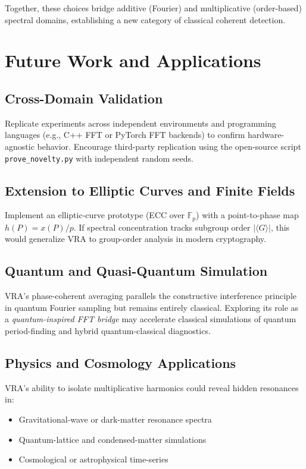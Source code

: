 \documentclass[conference]{IEEEtran}
\begin{document}
Together, these choices bridge additive (Fourier) and multiplicative (order-based) spectral domains, establishing a new category of classical coherent detection.


\section{Future Work and Applications}

\subsection{Cross-Domain Validation}

Replicate experiments across independent environments and programming languages (e.g., C++ FFT or PyTorch FFT backends) to confirm hardware-agnostic behavior.
Encourage third-party replication using the open-source script \texttt{prove\_novelty.py} with independent random seeds.

\subsection{Extension to Elliptic Curves and Finite Fields}

Implement an elliptic-curve prototype (ECC over $\mathbb{F}_p$) with a point-to-phase map $h(P) = x(P)/p$.
If spectral concentration tracks subgroup order $|\langle G \rangle|$, this would generalize VRA to group-order analysis in modern cryptography.

\subsection{Quantum and Quasi-Quantum Simulation}

VRA's phase-coherent averaging parallels the constructive interference principle in quantum Fourier sampling but remains entirely classical.
Exploring its role as a \emph{quantum-inspired FFT bridge} may accelerate classical simulations of quantum period-finding and hybrid quantum-classical diagnostics.

\subsection{Physics and Cosmology Applications}

VRA's ability to isolate multiplicative harmonics could reveal hidden resonances in:
\begin{itemize}
    \item Gravitational-wave or dark-matter resonance spectra
    \item Quantum-lattice and condensed-matter simulations
    \item Cosmological or astrophysical time-series
\end{itemize}
\end{document}
